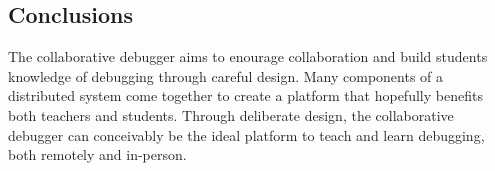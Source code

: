 \documentclass[12pt]{article}
\begin{document}
\subsection{Conclusions}

The collaborative debugger aims to enourage collaboration and build
students knowledge of debugging through careful design.  Many
components of a distributed system come together to create a platform
that hopefully benefits both teachers and students.  Through
deliberate design, the collaborative debugger can conceivably be the
ideal platform to teach and learn debugging, both remotely and
in-person.

\pagebreak

{}
\end{document}
